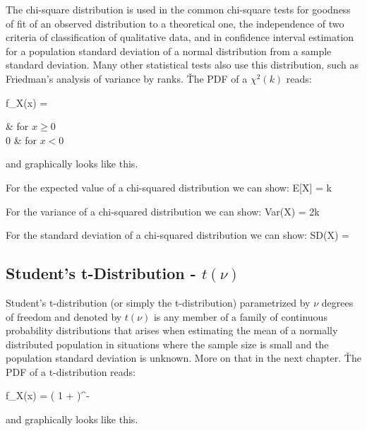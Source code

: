 The chi-square distribution is used in the common chi-square tests for goodness of fit of an observed distribution to
a theoretical one, the independence of two criteria of classification of qualitative data, and in confidence interval
estimation for a population standard deviation of a normal distribution from a sample standard deviation. Many other
statistical tests also use this distribution, such as Friedman's analysis of variance by ranks. \v

The PDF of a $\chi^2(k)$ reads:

\bse
f_{X}(x) = \begin{cases*}
 & for $x \geq 0$ \\ 0 & for $x < 0$
\end{cases*}
\ese
\ed

and graphically looks like this.

\vspace{10pt}

For the expected value of a chi-squared distribution we can show:
\bse
E[X] = k
\ese

For the variance of a chi-squared distribution we can show:
\bse
Var(X) = 2k
\ese

For the standard deviation of a chi-squared distribution we can show:
\bse
SD(X) = 
\ese

\subsection{Student's t-Distribution - $t(\nu)$}

Student's t-distribution (or simply the t-distribution) parametrized by $\nu$ degrees of freedom and denoted by $t
(\nu)$ is any member of a family of continuous probability distributions that arises when estimating the mean of a
normally distributed population in situations where the sample size is small and the population standard deviation is
unknown. More on that in the next chapter. \v

The PDF of a t-distribution reads:

\bse
f_{X}(x) =  \Big ( 1 +  \Big)^{- }
\ese
\ed

and graphically looks like this.

